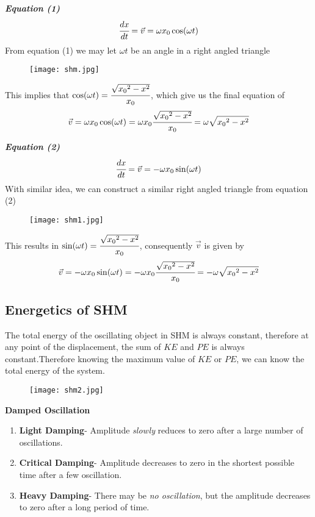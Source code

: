 \documentclass{article}
\begin{document}
 \textbf{\textit{Equation (1)}}
 $$\cfrac{dx}{dt}=\vec{v}=\omega x_0 \cos (\omega t)$$
 From equation (1) we may let $\omega t$ be an angle in a right angled triangle
 \begin{figure}[H]
     \centering
     \texttt{[image: shm.jpg]}
 \end{figure}
This implies that $\cos (\omega t)=\cfrac{\sqrt{{x_0}^2-x^2}}{x_0}$, which give us the final equation of 
$$\vec{v}=\omega x_0 \cos (\omega t)=\omega x_0\cfrac{\sqrt{{x_0}^2-x^2}}{x_0}=\omega \sqrt{{x_0}^2-x^2}  $$
 
\textbf{\textit{ Equation (2)}}
 $$\cfrac{dx}{dt}=\vec{v}=-\omega x_0 \sin (\omega t)$$
 With similar idea, we can construct a similar right angled triangle from equation (2)
 \begin{figure}[H]
     \centering
     \texttt{[image: shm1.jpg]}
 \end{figure}
 This results in $\sin (\omega t)=\cfrac{\sqrt{{x_0}^2-x^2}}{x_0}$, consequently $\vec{v}$ is given by 
 $$\vec{v}=-\omega x_0 \sin (\omega t)=-\omega x_0\cfrac{\sqrt{{x_0}^2-x^2}}{x_0}=-\omega \sqrt{{x_0}^2-x^2}$$


 \subsection{Energetics of SHM}


The total energy of the oscillating object in SHM is always constant, therefore at any point of the displacement, the sum of $KE$ and $PE$ is always constant.Therefore knowing the maximum value of $KE$ or $PE$, we can know the total energy of the system.

\begin{figure}[H]
    \centering
    \texttt{[image: shm2.jpg]}
\end{figure}
\newpage
\begin{flushleft}
     \textbf{Damped Oscillation}
\end{flushleft}

\begin{enumerate}
    \item \textbf{Light Damping}- Amplitude \textit{slowly} reduces to zero after a large number of oscillations.
     \item \textbf{Critical Damping}- Amplitude decreases to zero in the shortest possible time after a few oscillation.
     \item \textbf{Heavy Damping}- There may be \textit{no oscillation}, but the amplitude decreases to zero after a long period of time. 
\end{enumerate}
\end{document}
